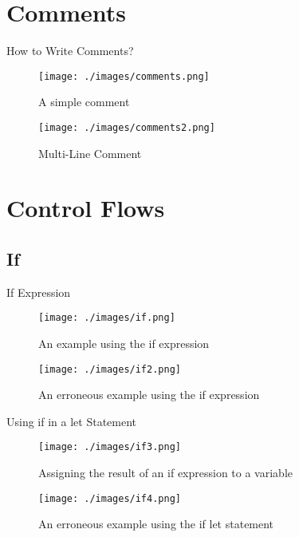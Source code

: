 \documentclass[10pt]{beamer}
\begin{document}
\section{Comments}
\begin{frame}{How to Write Comments?}
    \begin{figure}[htpb]
        \centering
        \texttt{[image: ./images/comments.png]}
        \caption{A simple comment\cite{rust-book}}
    \end{figure}

    \begin{figure}[htpb]
        \centering
        \texttt{[image: ./images/comments2.png]}
        \caption{Multi-Line Comment\cite{rust-book}}
    \end{figure}
\end{frame}

\section{Control Flows}
\subsection{If}
\begin{frame}{If Expression}
    \begin{figure}[htpb]
        \centering
        \texttt{[image: ./images/if.png]}
        \vspace*{-2mm}
        \caption{An example using the if expression\cite{rust-book}}
    \end{figure}

    \vspace*{-5mm}
    \begin{figure}[htpb]
        \centering
        \texttt{[image: ./images/if2.png]}
        \vspace*{-2mm}
        \caption{An erroneous example using the if expression\cite{rust-book}}
    \end{figure}
\end{frame}

\begin{frame}{Using if in a let Statement}
    \begin{figure}[htpb]
        \centering
        \texttt{[image: ./images/if3.png]}
        \caption{Assigning the result of an if expression to a variable\cite{rust-book}}
    \end{figure}

    \begin{figure}[htpb]
        \centering
        \texttt{[image: ./images/if4.png]}
        \caption{An erroneous example using the if let statement\cite{rust-book}}
    \end{figure}
\end{frame}
\end{document}
